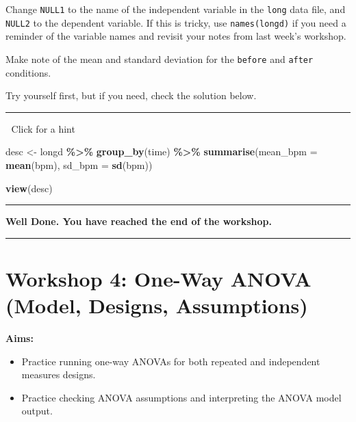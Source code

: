 \documentclass[
]{book}
\newenvironment{Shaded}{\begin{snugshade}}{\end{snugshade}}
\newcommand{\AttributeTok}[1]{\textcolor[rgb]{0.13,0.29,0.53}{#1}}
\newcommand{\FunctionTok}[1]{\textcolor[rgb]{0.13,0.29,0.53}{\textbf{#1}}}
\newcommand{\NormalTok}[1]{#1}
\newcommand{\OtherTok}[1]{\textcolor[rgb]{0.56,0.35,0.01}{#1}}
\newcommand{\SpecialCharTok}[1]{\textcolor[rgb]{0.81,0.36,0.00}{\textbf{#1}}}
\providecommand{\tightlist}{%
  \setlength{\itemsep}{0pt}\setlength{\parskip}{0pt}}
\begin{document}
Change \texttt{NULL1} to the name of the independent variable in the \texttt{long} data file, and \texttt{NULL2} to the dependent variable. If this is tricky, use \texttt{names(longd)} if you need a reminder of the variable names and revisit your notes from last week's workshop.

Make note of the mean and standard deviation for the \texttt{before} and \texttt{after} conditions.

Try yourself first, but if you need, check the solution below.

\begin{center}\rule{0.5\linewidth}{0.5pt}\end{center}

👀 Click for a hint

\begin{Shaded}
\begin{Highlighting}[]
\NormalTok{desc }\OtherTok{\textless{}{-}}\NormalTok{ longd }\SpecialCharTok{\%\textgreater{}\%}
  \FunctionTok{group\_by}\NormalTok{(time) }\SpecialCharTok{\%\textgreater{}\%}
  \FunctionTok{summarise}\NormalTok{(}\AttributeTok{mean\_bpm =} \FunctionTok{mean}\NormalTok{(bpm),}
            \AttributeTok{sd\_bpm =} \FunctionTok{sd}\NormalTok{(bpm))}

\FunctionTok{view}\NormalTok{(desc)}
\end{Highlighting}
\end{Shaded}

\begin{center}\rule{0.5\linewidth}{0.5pt}\end{center}

\textbf{Well Done. You have reached the end of the workshop.}

\begin{center}\rule{0.5\linewidth}{0.5pt}\end{center}

\chapter{Workshop 4: One-Way ANOVA (Model, Designs, Assumptions)}\label{workshop-4-one-way-anova-model-designs-assumptions}

\textbf{Aims:}

\begin{itemize}
\tightlist
\item
  Practice running one-way ANOVAs for both repeated and independent measures designs.
\item
  Practice checking ANOVA assumptions and interpreting the ANOVA model output.
\end{itemize}
\end{document}
